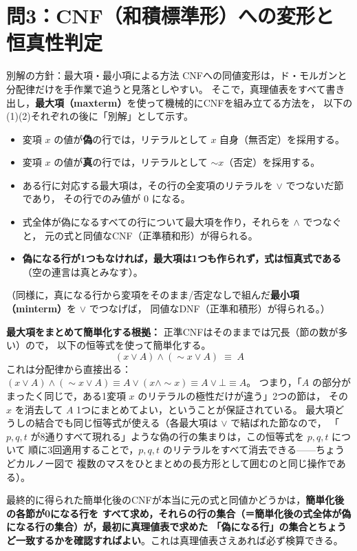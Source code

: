 \documentclass[autodetect-engine,dvi=dvipdfmx,ja=standard]{bxjsarticle}
\begin{document}
\section{問3：CNF（和積標準形）への変形と恒真性判定}

\begin{sidebox}[TBteal]{別解の方針：最大項・最小項による方法}
CNFへの同値変形は，ド・モルガンと分配律だけを手作業で追うと見落としやすい。
そこで，真理値表をすべて書き出し，\textbf{最大項（maxterm）}を使って機械的にCNFを組み立てる方法を，
以下の(1)(2)それぞれの後に「別解」として示す。

\begin{itemize}
  \item 変項 \(x\) の値が\textbf{偽}の行では，リテラルとして \(x\) 自身（無否定）を採用する。
  \item 変項 \(x\) の値が\textbf{真}の行では，リテラルとして \(\sim x\)（否定）を採用する。
  \item ある行に対応する最大項は，その行の全変項のリテラルを \(\lor\) でつないだ節であり，
    その行でのみ値が \(0\) になる。
  \item 式全体が偽になるすべての行について最大項を作り，それらを \(\land\) でつなぐと，
    元の式と同値なCNF（正準積和形）が得られる。
  \item \textbf{偽になる行が1つもなければ，最大項は1つも作られず，式は恒真式である}
    （空の連言は真とみなす）。
\end{itemize}
（同様に，真になる行から変項をそのまま/否定なしで組んだ\textbf{最小項（minterm）}を \(\lor\) でつなげば，
同値なDNF（正準和積形）が得られる。）

\textbf{最大項をまとめて簡単化する根拠：} 正準CNFはそのままでは冗長（節の数が多い）ので，
以下の恒等式を使って簡単化する。
\[
  (x\lor A)\land(\sim x\lor A)\;\equiv\;A
\]
これは分配律から直接出る：\((x\lor A)\land(\sim x\lor A)\equiv A\lor(x\land\sim x)\equiv A\lor\bot\equiv A\)。
つまり，「\(A\) の部分がまったく同じで，ある1変項 \(x\) のリテラルの極性だけが違う」2つの節は，
その \(x\) を消去して \(A\) 1つにまとめてよい，ということが保証されている。
最大項どうしの結合でも同じ恒等式が使える（各最大項は \(\lor\) で結ばれた節なので，
「\(p,q,t\) が8通りすべて現れる」ような偽の行の集まりは，この恒等式を \(p,q,t\) について
順に3回適用することで，\(p,q,t\) のリテラルをすべて消去できる——ちょうどカルノー図で
複数のマスをひとまとめの長方形として囲むのと同じ操作である）。

最終的に得られた簡単化後のCNFが本当に元の式と同値かどうかは，\textbf{簡単化後の各節が0になる行を
すべて求め，それらの行の集合（＝簡単化後の式全体が偽になる行の集合）が，最初に真理値表で求めた
「偽になる行」の集合とちょうど一致するかを確認すればよい}。これは真理値表さえあれば必ず検算できる。
\end{sidebox}
\end{document}
